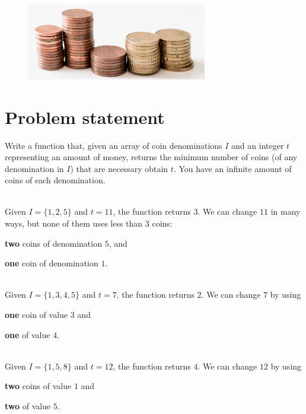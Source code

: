 \begin{figure}[t]
	\label{fig:clone_list_random_pointer:list1}
	\centering
	\includegraphics[width=0.7\textwidth]{sources/coin_change/images/coin_stacks}
\end{figure}


\section{Problem statement}
\begin{exercise}
Write a function that, given an array of coin denominations $I$ and an integer $t$ representing an amount of money, returns
the minimum number of coins (of any denomination in $I$) that are necessary obtain $t$. 
You have an infinite amount of coins of each denomination. 

	\begin{example}
		\label{ex:coin_change:example1}
		\hfill \\
		Given $I=\{1,2,5\}$ and $t=11$, the function returns $3$.
		We can change $11$ in many ways, but none of them uses less than $3$ coins:
		\begin{itemize*}
			\item \textbf{two} coins of denomination $5$, and
			\item \textbf{one} coin of denomination $1$.
		\end{itemize*}
	\end{example}

	\begin{example}
		\hfill \\
		Given $I=\{1,3,4,5\}$ and $t=7$, the function returns $2$.
		We can change $7$ by using 
		\begin{itemize*}
			\item \textbf{one} coin of value $3$ and
			\item \textbf{one} of value $4$.
		\end{itemize*}
	\end{example}

	\begin{example}
		\label{ex:coin_change:example3}
		\hfill \\
		Given $I=\{1,5,8\}$ and $t=12$, the function returns $4$.
		We can change $12$ by using
		\begin{itemize*}
			\item \textbf{two} coins of value $1$ and
			\item \textbf{two} of value $5$.
		\end{itemize*}
	\end{example}
\end{exercise}

